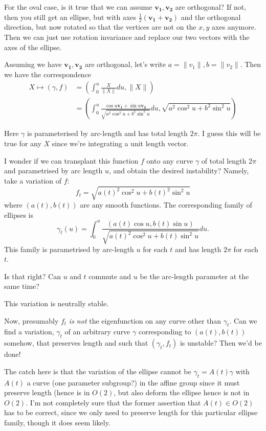 \documentclass{amsart}
\begin{document}
For the oval case, is it true that we can assume \(\mathbf{v_1}, \mathbf{v_2}\) are orthogonal? If not, then you still get an ellipse, but with axes \(\tfrac{1}{2} (\mathbf{v_1} +  \mathbf{v_2})\) and the orthogonal direction, but now rotated so that the vertices are not on the \(x,y\) axes anymore. Then we can just use rotation invariance and replace our two vectors with the axes of the ellipse.

Assuming we have \(\mathbf{v_1}, \mathbf{v_2}\) are orthogonal, let's write 
\(a = \|v_1\|, b = \|v_2\|\). Then we have the correspondence 
\[
\begin{split}
X \mapsto (\gamma, f) &= \left(\int_0^{u} \frac{X}{\|X\|} du, \|X\|\right) \\
&= \left(\int_0^{u} \frac{\cos u \mathbf{v_1} + \sin u \mathbf{v_2}}{\sqrt{a^2 \cos^2 u + b^2 \sin^2 u}} du, \sqrt{a^2 \cos^2 u + b^2 \sin^2 u} \right)
\end{split}
\]

Here \(\gamma\) is parameterised by arc-length and has total length \(2\pi\). I guess this will be true for any \(X\) since we're integrating a unit length vector. 

I wonder if we can transplant this function \(f\) onto any curve \(\gamma\)  of total length \(2\pi\) and parametrised by arc length \(u\), and obtain the desired instability? Namely, take a variation of \(f\):
\[
f_t = \sqrt{a(t)^2 \cos^2 u + b(t)^2 \sin^2 u}
\]
where \((a(t), b(t))\) are any smooth functions. The corresponding family of ellipses is
\[
\gamma_t(u) = \int_0^u \frac{(a(t) \cos u, b(t) \sin u)}{\sqrt{a(t)^2 \cos^2 u + b(t) \sin^2 u}} du.
\]
This family is parametrised by arc-length \(u\) for each \(t\) and has length \(2\pi\) for each \(t\).

Is that right? Can \(u\) and \(t\) commute and \(u\) be the arc-length parameter at the same time?

This variation is neutrally stable.

Now, presumably \(f_t\) \emph{is not} the eigenfunction on any curve other than \(\gamma_t\). Can we find a variation, \(\gamma_t\) of an arbitrary curve \(\gamma\) corresponding to \((a(t), b(t))\) somehow, that preserves length and such that \((\gamma_t, f_t)\) is unstable? Then we'd be done!



The catch here is that the variation of the ellipse cannot be \(\gamma_t = A(t) \gamma\) with \(A(t)\) a curve (one parameter subgroup?) in the affine group since it must preserve length (hence is in \(O(2)\), but also deform the ellipse hence is not in \(O(2)\). I'm not completely sure that the former assertion that \(A(t) \in O(2)\) has to be correct, since we only need to preserve length for this particular ellipse family, though it does seem likely.
\end{document}
